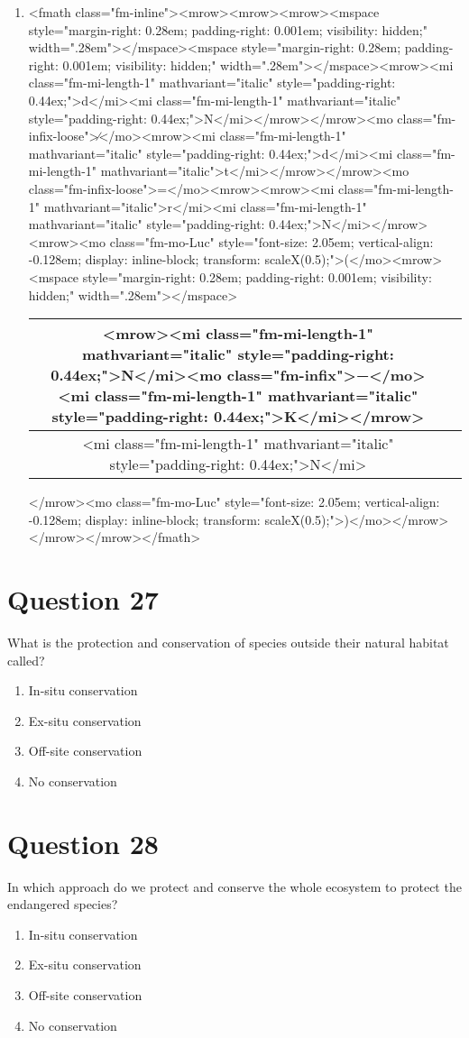 \documentclass{article}
\begin{document}
\begin{enumerate}[label=(\alph*)]
\item  <fmath class="fm-inline"><mrow><mrow><mrow><mspace style="margin-right: 0.28em; padding-right: 0.001em; visibility: hidden;" width=".28em">‌</mspace><mspace style="margin-right: 0.28em; padding-right: 0.001em; visibility: hidden;" width=".28em">‌</mspace><mrow><mi class="fm-mi-length-1" mathvariant="italic" style="padding-right: 0.44ex;">d</mi><mi class="fm-mi-length-1" mathvariant="italic" style="padding-right: 0.44ex;">N</mi></mrow></mrow><mo class="fm-infix-loose">∕</mo><mrow><mi class="fm-mi-length-1" mathvariant="italic" style="padding-right: 0.44ex;">d</mi><mi class="fm-mi-length-1" mathvariant="italic">t</mi></mrow></mrow><mo class="fm-infix-loose">=</mo><mrow><mrow><mi class="fm-mi-length-1" mathvariant="italic">r</mi><mi class="fm-mi-length-1" mathvariant="italic" style="padding-right: 0.44ex;">N</mi></mrow><mrow><mo class="fm-mo-Luc" style="font-size: 2.05em; vertical-align: -0.128em; display: inline-block; transform: scaleX(0.5);">(</mo><mrow><mspace style="margin-right: 0.28em; padding-right: 0.001em; visibility: hidden;" width=".28em">‌</mspace>\begin{tabular}{|c|c|}
\hline
<mrow><mi class="fm-mi-length-1" mathvariant="italic" style="padding-right: 0.44ex;">N</mi><mo class="fm-infix">−</mo><mi class="fm-mi-length-1" mathvariant="italic" style="padding-right: 0.44ex;">K</mi></mrow> \\
\hline
<mi class="fm-mi-length-1" mathvariant="italic" style="padding-right: 0.44ex;">N</mi> \\
\hline
\end{tabular}
</mrow><mo class="fm-mo-Luc" style="font-size: 2.05em; vertical-align: -0.128em; display: inline-block; transform: scaleX(0.5);">)</mo></mrow></mrow></mrow></fmath>
\end{enumerate}
\newpage
\section*{Question 27}
What is the protection and conservation of species outside their natural habitat called?\newline
\begin{enumerate}[label=(\alph*)]
\item In-situ conservation
\item Ex-situ conservation
\item Off-site conservation
\item No conservation
\end{enumerate}
\newpage
\section*{Question 28}
In which approach do we protect and conserve the whole ecosystem to protect the endangered species?\newline
\begin{enumerate}[label=(\alph*)]
\item In-situ conservation
\item Ex-situ conservation
\item Off-site conservation
\item No conservation
\end{enumerate}
\newpage
\end{document}
